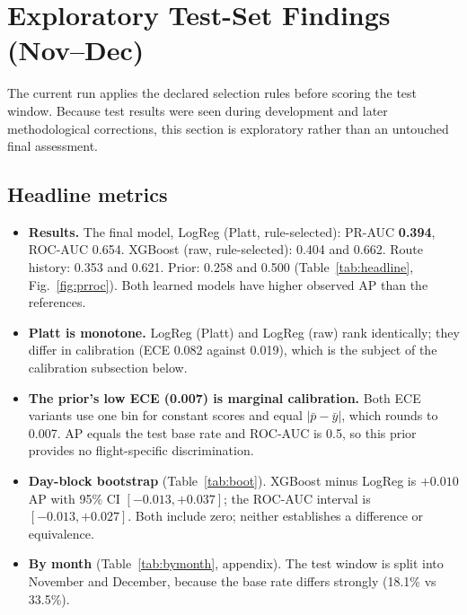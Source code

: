 \documentclass[conference]{IEEEtran}
\newcommand{\tabsize}{\footnotesize}
\begin{document}
\section{Exploratory Test-Set Findings (Nov--Dec)}\label{sec:exploratory}
The current run applies the declared selection rules before scoring the test window. Because test results were seen during development and later methodological corrections, this section is exploratory rather than an untouched final assessment.

\subsection{Headline metrics}
\begin{itemize}
\item \textbf{Results.} The final model, LogReg (Platt, rule-selected): PR-AUC \textbf{0.394}, ROC-AUC 0.654. XGBoost (raw, rule-selected): 0.404 and 0.662. Route history: 0.353 and 0.621. Prior: 0.258 and 0.500 (Table~\ref{tab:headline}, Fig.~\ref{fig:prroc}). Both learned models have higher observed AP than the references.
\item \textbf{Platt is monotone.} LogReg (Platt) and LogReg (raw) rank identically; they differ in calibration (ECE 0.082 against 0.019), which is the subject of the calibration subsection below.
\item \textbf{The prior's low ECE (0.007) is marginal calibration.} Both ECE variants use one bin for constant scores and equal $\lvert\bar p-\bar y\rvert$, which rounds to 0.007. AP equals the test base rate and ROC-AUC is 0.5, so this prior provides no flight-specific discrimination.
\item \textbf{Day-block bootstrap} (Table~\ref{tab:boot}). XGBoost minus LogReg is $+0.010$ AP with 95\% CI $[-0.013,+0.037]$; the ROC-AUC interval is $[-0.013,+0.027]$. Both include zero; neither establishes a difference or equivalence.
\item \textbf{By month} (Table~\ref{tab:bymonth}, appendix). The test window is split into November and December, because the base rate differs strongly (18.1\% vs 33.5\%).
\end{itemize}

\begin{table}[!t]
\caption[Test ranking and calibration metrics.]{Test metrics (Nov--Dec). Oracle rec.\ is the best recall at precision $\ge0.40$ with the threshold tuned on test labels: comparison only.}
\label{tab:headline}
\centering\tabsize

\end{table}
\end{document}
